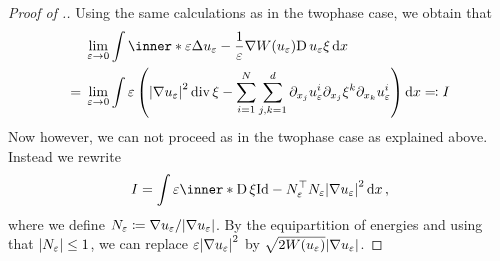 \begin{proof}[Proof of .]
	Using the same calculations as in the twophase case, we obtain that
	\begin{align*}
		& \lim_{ \varepsilon \to 0 }
			\int
				\inner*{
					\varepsilon \Delta u_{ \varepsilon }
					-
					\frac{ 1 }{ \varepsilon } \nabla W ( u_{ \varepsilon } )
				}
				{
					\diff u_{ \varepsilon } \xi
				}
			\dd{ x }
		\\
		={} &
		\lim_{ \varepsilon \to 0 }
			\int
				\varepsilon
				\left(
					\abs{ \nabla u_{ \varepsilon } }^{ 2 }
					\divg \xi 
					-
					\sum_{ i = 1 }^{ N }
						\sum_{ j, k = 1 }^{ d }
							\partial_{ x_{ j } } u_{ \varepsilon }^{ i }
							\partial_{ x_{ j } } \xi^{ k }
							\partial_{ x_{ k } } u_{ \varepsilon }^{ i }
				\right)
			\dd{ x } 
			\eqqcolon I
	\end{align*}
	Now however, we can not proceed as in the twophase case as explained above. 
	Instead we rewrite
	\begin{equation}
		\label{key_equality_for_ptw_estimate}
		I
		=
		\int
			\varepsilon
			\inner*{
				\diff \xi 
			}
			{
				\mathrm{Id} - N_{ \varepsilon }^{ \top } N_{ \varepsilon }
			}
			\abs{ \nabla u_{ \varepsilon } }^{ 2 }
		\dd{ x },
	\end{equation}
	where we define $ N_{ \varepsilon } \coloneqq \nabla u_{ \varepsilon } / \abs{ \nabla u_{ \varepsilon } } $. By the equipartition of energies  and using that $ \abs{N_{ \varepsilon } } \leq 1 $, we can replace $ \varepsilon \abs{ \nabla u_{ \varepsilon } }^{ 2 } $ by $ \sqrt{ 2 W ( u_{ \varepsilon } ) } \abs{ \nabla u_{ \varepsilon  } } $. 
	

\end{proof}
